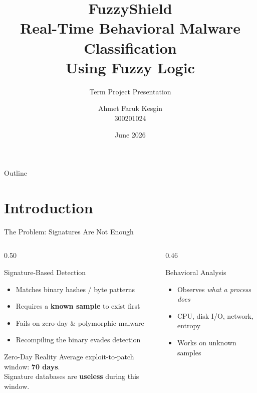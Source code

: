 \documentclass[aspectratio=169,12pt]{beamer}
\title[FuzzyShield]{%
  \textbf{FuzzyShield}\\[0.2em]
  \normalsize Real-Time Behavioral Malware Classification\\
  Using Fuzzy Logic}
\subtitle{Term Project Presentation}
\author[A.\ F.\ Kesgin]{%
  Ahmet Faruk Kesgin\\
  \small\mbox{300201024}}
\institute[IYTE]{%
  Department of Computer Engineering\\
  Izmir Institute of Technology}
\date{June 2026}
\begin{document}
\begin{frame}[plain]
  \titlepage
\end{frame}

\begin{frame}{Outline}
  \tableofcontents
\end{frame}

\section{Introduction}

\begin{frame}{The Problem: Signatures Are Not Enough}
  \begin{columns}[T]
    \begin{column}{0.50\textwidth}
      \begin{alertblock}{Signature-Based Detection}
        \begin{itemize}\small
          \item Matches binary hashes / byte patterns
          \item Requires a \textbf{known sample} to exist first
          \item Fails on \alert{zero-day} \& polymorphic malware
          \item Recompiling the binary evades detection
        \end{itemize}
      \end{alertblock}
      \vspace{0.4em}
      \begin{block}{Zero-Day Reality}
        \small
        Average exploit-to-patch window: \textbf{70 days}.\\
        Signature databases are \textbf{useless} during this window.
      \end{block}
    \end{column}
    \begin{column}{0.46\textwidth}
      \begin{exampleblock}{Behavioral Analysis}
        \begin{itemize}\small
          \item Observes \emph{what a process does}
          \item CPU, disk I/O, network, entropy
          \item Works on \alert{unknown} samples

\end{itemize}
\end{exampleblock}
\end{column}
\end{columns}
\end{frame}
\end{document}
